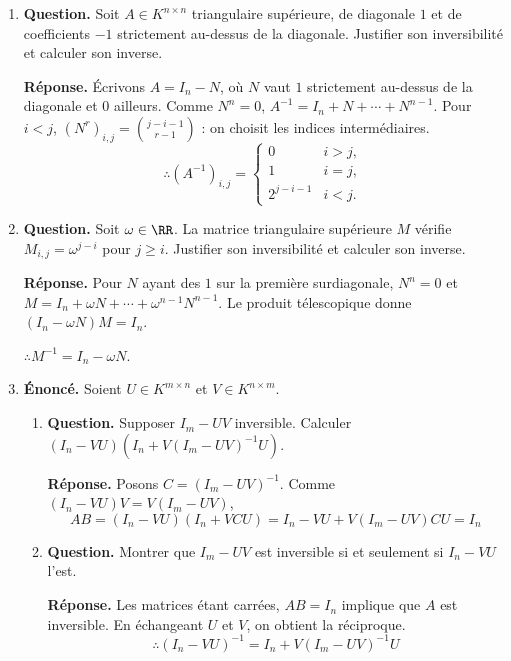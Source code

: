 \documentclass[12pt, a4paper]{article}
\begin{document}
\begin{enumerate}[label=4.\arabic*., start=60]
  \item \begin{minipage}[t]{\linewidth}\raggedright
\textbf{Question.} Soit $A\in K^{n\times n}$ triangulaire supérieure, de diagonale $1$ et de coefficients $-1$ strictement au-dessus de la diagonale. Justifier son inversibilité et calculer son inverse.
\par\smallskip
\textbf{Réponse.} Écrivons $A=I_n-N$, où $N$ vaut $1$ strictement au-dessus de la diagonale et $0$ ailleurs.
    Comme $N^n=0$, $A^{-1}=I_n+N+\cdots+N^{n-1}$.
    Pour $i<j$, $(N^r)_{i,j}=\binom{j-i-1}{r-1}$ : on choisit les indices intermédiaires.
    \[
      \therefore (A^{-1})_{i,j}=\begin{cases}0&i>j,\\1&i=j,\\2^{j-i-1}&i<j.\end{cases}
    \]
\end{minipage}

  \item \begin{minipage}[t]{\linewidth}\raggedright
\textbf{Question.} Soit $\omega\in\RR$. La matrice triangulaire supérieure $M$ vérifie $M_{i,j}=\omega^{j-i}$ pour $j\geq i$. Justifier son inversibilité et calculer son inverse.
\par\smallskip
\textbf{Réponse.} Pour $N$ ayant des $1$ sur la première surdiagonale, $N^n=0$ et
    $M=I_n+\omega N+\cdots+\omega^{n-1}N^{n-1}$.
    Le produit télescopique donne $(I_n-\omega N)M=I_n$.

    $\therefore M^{-1}=I_n-\omega N$.
\end{minipage}

  \item \begin{minipage}[t]{\linewidth}\raggedright
\textbf{Énoncé.} Soient $U\in K^{m\times n}$ et $V\in K^{n\times m}$.

\begin{enumerate}[\arabic*.]
        \item \textbf{Question.} Supposer $I_m-UV$ inversible. Calculer $(I_n-VU)(I_n+V(I_m-UV)^{-1}U)$.
\par\smallskip
\textbf{Réponse.} Posons $C=(I_m-UV)^{-1}$. Comme $(I_n-VU)V=V(I_m-UV)$,
        \[
          AB=(I_n-VU)(I_n+VCU)=I_n-VU+V(I_m-UV)CU=I_n
        \]

  \item \textbf{Question.} Montrer que $I_m-UV$ est inversible si et seulement si $I_n-VU$ l’est.
\par\smallskip
\textbf{Réponse.} Les matrices étant carrées, $AB=I_n$ implique que $A$ est inversible.
        En échangeant $U$ et $V$, on obtient la réciproque.
        \[
          \therefore (I_n-VU)^{-1}=I_n+V(I_m-UV)^{-1}U
        \]


\end{enumerate}
\end{minipage}
\end{enumerate}
\end{document}
